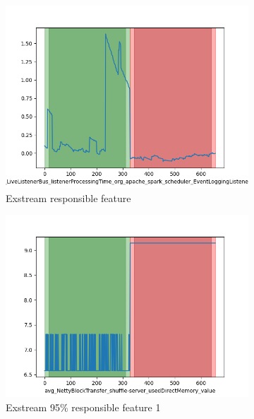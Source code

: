 \documentclass[oneside, a4paper, onecolumn, 11pt]{article}
\begin{document}
\begin{figure}[H]
  \centering
  \begin{subfigure}{0.3\textwidth}
      \centering
      \includegraphics[width=\linewidth]{images/ex_remove5bad.png}
      \caption{Exstream responsible feature}
  \end{subfigure}
  \hfill
  \begin{subfigure}{0.3\textwidth}
      \centering
      \includegraphics[width=\linewidth]{images/ex_remove5.png}
      \caption{Exstream 95\% responsible feature 1}
  \end{subfigure}
  \hfill
  \begin{subfigure}{0.3\textwidth}
      \centering

\end{subfigure}
\end{figure}
\end{document}
